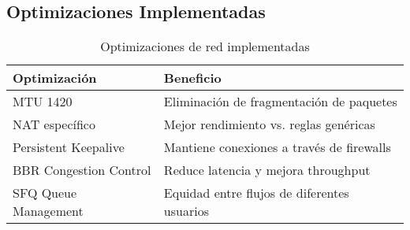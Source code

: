 \subsection{Optimizaciones Implementadas}

\begin{table}[H]
\centering
\caption{Optimizaciones de red implementadas}
\label{tab:optimizaciones}
\begin{tabular}{|l|p{8cm}|}
\hline
\textbf{Optimización} & \textbf{Beneficio} \\
\hline
MTU 1420 & Eliminación de fragmentación de paquetes \\
\hline
NAT específico & Mejor rendimiento vs. reglas genéricas \\
\hline
Persistent Keepalive & Mantiene conexiones a través de firewalls \\
\hline
BBR Congestion Control & Reduce latencia y mejora throughput \\
\hline
SFQ Queue Management & Equidad entre flujos de diferentes usuarios \\
\hline
\end{tabular}
\end{table}
